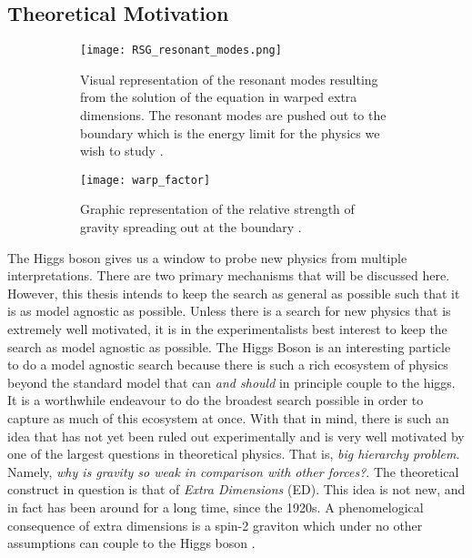 \documentclass[12pt]{article}
\begin{document}
\subsection{Theoretical Motivation}
\begin{figure}[t]
    \centering
    \begin{subfigure}[t]{.48\textwidth}
        \centering
        \texttt{[image: RSG\_resonant\_modes.png]}
        \caption{Visual representation of the resonant modes resulting from the
        solution of the equation in warped extra dimensions. The resonant modes
        are pushed out to the boundary which is the energy limit for the physics we
        wish to study \cite{bsm}.}
        \label{subfig:RSG_resonant_modes}
    \end{subfigure}
    \hfill
    \begin{subfigure}[t]{.48\textwidth}
        \centering
        \texttt{[image: warp\_factor]}
        \caption{Graphic representation of the relative strength of gravity
        spreading out at the boundary \cite{bsm}.}
        \label{subfig:warp_factor}
    \end{subfigure}
\caption{}
\label{fig:theoretical_motivation_figure}
\end{figure}
The Higgs boson gives us a window to probe new physics from multiple
interpretations. There are two primary mechanisms that will be discussed here.
However, this thesis intends to keep the search as general as possible such that
it is as model agnostic as possible. Unless there is a search for new physics
that is extremely well motivated, it is in the experimentalists best interest to
keep the search as model agnostic as possible. The Higgs Boson is an interesting
particle to do a model agnostic search because there is such a rich ecosystem of
physics beyond the standard model that can \textit{and should} in principle
couple to the higgs. It is a worthwhile endeavour to do the broadest search
possible in order to capture as much of this ecosystem at once. With that in
mind, there is such an idea that has not yet been ruled out experimentally and
is very well motivated by one of the largest questions in theoretical physics.
That is, \textit{big hierarchy problem}. Namely, \textit{why is gravity so weak
in comparison with other forces?}. The theoretical construct in question is that
of \textit{Extra Dimensions} (ED). This idea is not new, and in fact has been
around for a long time, since the 1920s. A phenomelogical consequence of extra
dimensions is a spin-2 graviton which under no other assumptions can couple to
the Higgs boson \cite{bsm}.  
\end{document}
